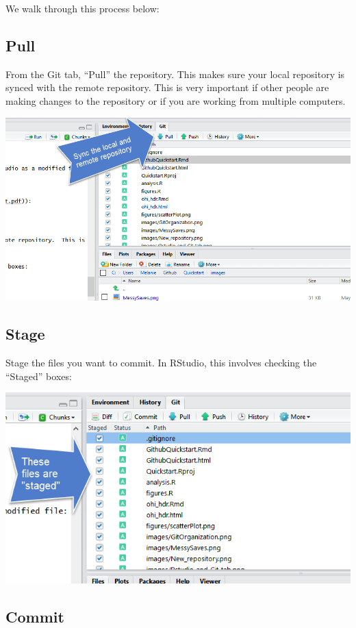 \documentclass[]{book}
\theoremstyle{definition}
\theoremstyle{definition}
\theoremstyle{definition}
\theoremstyle{remark}
\begin{document}
We walk through this process below:

\subsection{Pull}\label{pull}

From the Git tab, ``Pull'' the repository. This makes sure your local
repository is synced with the remote repository. This is very important
if other people are making changes to the repository or if you are
working from multiple computers.

\includegraphics{img/pull.png}

\subsection{Stage}\label{stage}

Stage the files you want to commit. In RStudio, this involves checking
the ``Staged'' boxes:

\includegraphics{img/staged.png}

\subsection{Commit}\label{commit}
\end{document}
